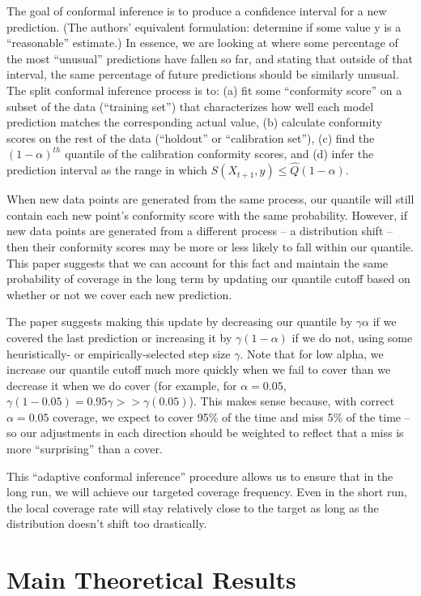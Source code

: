 \documentclass[
]{article}
\begin{document}
The goal of conformal inference is to produce a confidence interval for
a new prediction. (The authors' equivalent formulation: determine if
some value y is a ``reasonable'' estimate.) In essence, we are looking
at where some percentage of the most ``unusual'' predictions have fallen
so far, and stating that outside of that interval, the same percentage
of future predictions should be similarly unusual. The split conformal
inference process is to: (a) fit some ``conformity score'' on a subset
of the data (``training set'') that characterizes how well each model
prediction matches the corresponding actual value, (b) calculate
conformity scores on the rest of the data (``holdout'' or ``calibration
set''), (c) find the \((1-\alpha)^{th}\) quantile of the calibration
conformity scores, and (d) infer the prediction interval as the range in
which \(S(X_{t+1},y)\le \hat Q (1-\alpha)\).

When new data points are generated from the same process, our quantile
will still contain each new point's conformity score with the same
probability. However, if new data points are generated from a different
process -- a distribution shift -- then their conformity scores may be
more or less likely to fall within our quantile. This paper suggests
that we can account for this fact and maintain the same probability of
coverage in the long term by updating our quantile cutoff based on
whether or not we cover each new prediction.

The paper suggests making this update by decreasing our quantile by
\(\gamma\alpha\) if we covered the last prediction or increasing it by
\(\gamma(1-\alpha)\) if we do not, using some heuristically- or
empirically-selected step size \(\gamma\). Note that for low alpha, we
increase our quantile cutoff much more quickly when we fail to cover
than we decrease it when we do cover (for example, for
\(\alpha = 0.05\), \(\gamma(1-0.05) = 0.95\gamma >> \gamma(0.05)\)).
This makes sense because, with correct \(\alpha=0.05\) coverage, we
expect to cover 95\% of the time and miss 5\% of the time -- so our
adjustments in each direction should be weighted to reflect that a miss
is more ``surprising'' than a cover.

This ``adaptive conformal inference'' procedure allows us to ensure that
in the long run, we will achieve our targeted coverage frequency. Even
in the short run, the local coverage rate will stay relatively close to
the target as long as the distribution doesn't shift too drastically.

\hypertarget{main-theoretical-results}{%
\section{Main Theoretical Results}\label{main-theoretical-results}}
\end{document}
